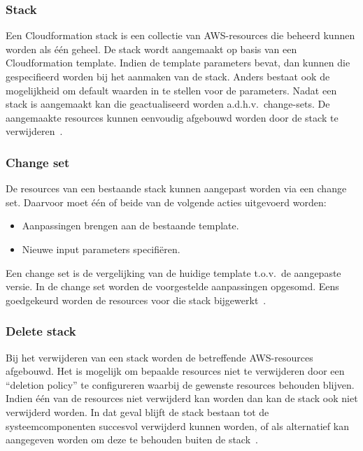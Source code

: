 \subsubsection{Stack}

Een Cloudformation stack is een collectie van AWS-resources die beheerd kunnen worden als één geheel.
De stack wordt aangemaakt op basis van een Cloudformation template.
Indien de template parameters bevat, dan kunnen die gespecifieerd worden bij het aanmaken van de stack.
Anders bestaat ook de mogelijkheid om default waarden in te stellen voor de parameters.
Nadat een stack is aangemaakt kan die geactualiseerd worden a.d.h.v.\ change-sets.
De aangemaakte resources kunnen eenvoudig afgebouwd worden door de stack te verwijderen~\autocite{AWSCLoudformationUser}.

\subsubsection{Change set}

De resources van een bestaande stack kunnen aangepast worden via een change set.
Daarvoor moet één of beide van de volgende acties uitgevoerd worden:

\begin{itemize}
    \item Aanpassingen brengen aan de bestaande template.
    \item Nieuwe input parameters specifiëren.
\end{itemize}

Een change set is de vergelijking van de huidige template t.o.v.\ de aangepaste versie.
In de change set worden de voorgestelde aanpassingen opgesomd.
Eens goedgekeurd worden de resources voor die stack bijgewerkt~\autocite{AWSCLoudformationUser}.

\subsubsection{Delete stack}

Bij het verwijderen van een stack worden de betreffende AWS-resources afgebouwd.
Het is mogelijk om bepaalde resources niet te verwijderen door een “deletion policy” te configureren waarbij de gewenste resources behouden blijven.
Indien één van de resources niet verwijderd kan worden dan kan de stack ook niet verwijderd worden.
In dat geval blijft de stack bestaan tot de systeemcomponenten succesvol verwijderd kunnen worden, of als alternatief kan aangegeven worden om deze te behouden buiten de stack~\autocite{AWSCLoudformationUser}.

